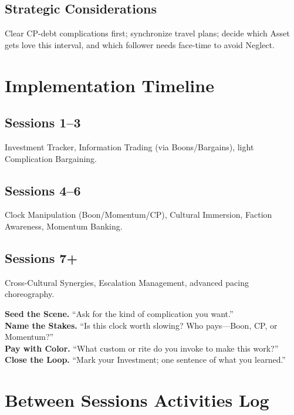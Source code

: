 \begin{multicols}{2}
\subsection{Strategic Considerations}
Clear CP-debt complications first; synchronize travel plans; decide which Asset gets love this interval, and which follower needs face-time to avoid Neglect.

\section{Implementation Timeline}

\subsection*{Sessions 1–3}
Investment Tracker, Information Trading (via Boons/Bargains), light Complication Bargaining.

\subsection*{Sessions 4–6}
Clock Manipulation (Boon/Momentum/CP), Cultural Immersion, Faction Awareness, Momentum Banking.

\subsection*{Sessions 7+}
Cross-Cultural Synergies, Escalation Management, advanced pacing choreography.

\begin{tcolorbox}[colback=blue!5!white,colframe=blue!75!black,title=At-Table Prompts,fonttitle=\bfseries]
\textbf{Seed the Scene.} “Ask for the kind of complication you want.”\\
\textbf{Name the Stakes.} “Is this clock worth slowing? Who pays—Boon, CP, or Momentum?”\\
\textbf{Pay with Color.} “What custom or rite do you invoke to make this work?”\\
\textbf{Close the Loop.} “Mark your Investment; one sentence of what you learned.”
\end{tcolorbox}

\section{Between Sessions Activities Log}


\end{multicols}
